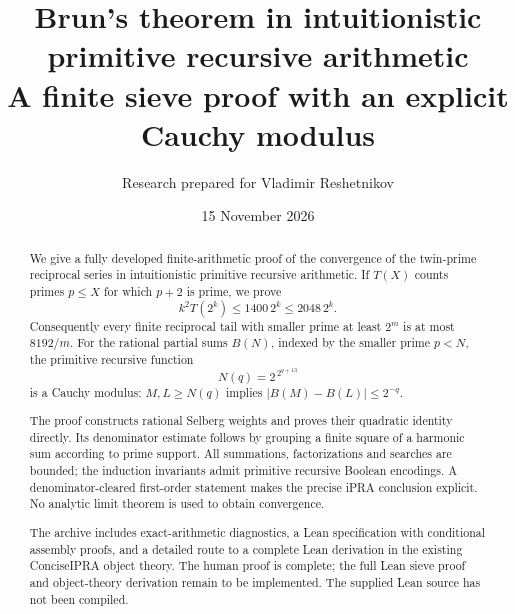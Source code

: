 \documentclass[11pt,a4paper]{article}
\title{\color{ink}\bfseries Brun's theorem in intuitionistic\\
primitive recursive arithmetic\\[5pt]
\large A finite sieve proof with an explicit Cauchy modulus}
\author{Research prepared for Vladimir Reshetnikov}
\date{15 November 2026}
\theoremstyle{definition}
\begin{document}
\maketitle
\begin{abstract}
We give a fully developed finite-arithmetic proof of the convergence of the
twin-prime reciprocal series in intuitionistic primitive recursive arithmetic.
If \(T(X)\) counts primes \(p\le X\) for which \(p+2\) is prime, we prove
\[
 k^2T(2^k)\le 1400\,2^k\le 2048\,2^k.
\]
Consequently every finite reciprocal tail with smaller prime at least \(2^m\)
is at most \(8192/m\). For the rational partial sums \(B(N)\), indexed by
the smaller prime \(p<N\), the primitive recursive function
\[
 N(q)=2^{\,2^{q+13}}
\]
is a Cauchy modulus: \(M,L\ge N(q)\) implies
\(\lvert B(M)-B(L)\rvert\le2^{-q}\).

The proof constructs rational Selberg weights and proves their quadratic
identity directly. Its denominator estimate follows by grouping a finite
square of a harmonic sum according to prime support. All summations,
factorizations and searches are bounded; the induction invariants admit
primitive recursive Boolean encodings. A denominator-cleared first-order
statement makes the precise iPRA conclusion explicit. No analytic limit
theorem is used to obtain convergence.

The archive includes exact-arithmetic diagnostics, a Lean specification
with conditional assembly proofs, and a detailed route to a complete Lean
derivation in the existing ConciseIPRA object theory. The human proof is
complete; the full Lean sieve proof and object-theory derivation remain
to be implemented. The supplied Lean source has not been compiled.
\end{abstract}
\clearpage
\begingroup
\small
\setlength{\parskip}{0pt}
\tableofcontents
\endgroup
\newpage









\end{document}
